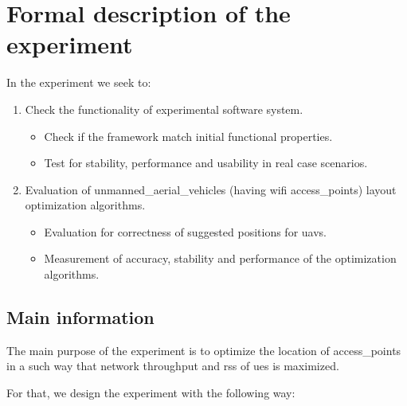 \section{Formal description of the
experiment}\label{formal-description-of-the-experiment}

In the experiment we seek to:

\begin{enumerate}
\def\labelenumi{\arabic{enumi}.}
\tightlist
\item
  Check the functionality of experimental software system.
  
  \begin{itemize}
  	\tightlist
  	\item
  	Check if the framework match initial functional properties.
  	\item
  	Test for stability, performance and usability in real case scenarios.
  \end{itemize}

\item
  Evaluation of \glspl{unmanned_aerial_vehicle} (having \gls{wifi} \glspl{access_point}) layout optimization algorithms.
  
  \begin{itemize}
  	\tightlist
  	\item
  	Evaluation for correctness of suggested positions for \glspl{uav}.
  	\item
  	Measurement of accuracy, stability and performance of the	optimization algorithms.
  \end{itemize}
  
\end{enumerate}


\subsection{Main information}\label{main-information}

The main purpose of the experiment is to optimize the location of \glspl{access_point} in a such way that network throughput and \acrshort{rss} of \glspl{ue} is maximized.

For that, we design the experiment with the following way:

